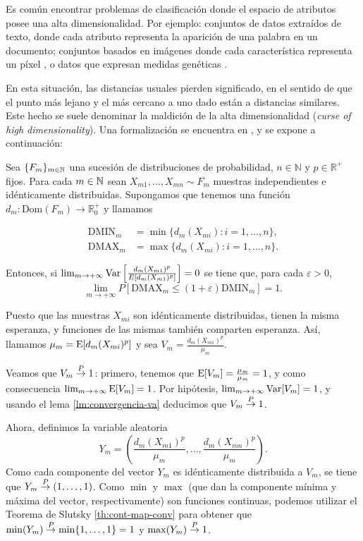 Es común encontrar problemas de clasificación donde el espacio de
atributos posee una alta dimensionalidad. Por ejemplo: conjuntos de
datos extraídos de texto, donde cada atributo representa la aparición de
una palabra en un documento; conjuntos basados en imágenes donde cada
característica representa un píxel \autocite{mnist}, o datos que
expresan medidas genéticas \autocite{clarke2008}.

En esta situación, las distancias usuales pierden significado, en el
sentido de que el punto más lejano y el más cercano a uno dado están a
distancias similares. Este hecho se suele denominar la maldición de la
alta dimensionalidad (\emph{curse of high dimensionality}). Una
formalización se encuentra en \textcite{beyer1999}, y se expone a
continuación:

\theob
Sea \(\{F_{m}\}_{m\in\mathbb{N}}\) una sucesión de distribuciones de
probabilidad, \(n\in \mathbb N\) y \(p\in\mathbb R^+\) fijos. Para cada
\(m\in\mathbb{N}\) sean \(X_{m1},\dots,X_{mn}\sim F_m\) muestras independientes
e idénticamente distribuidas. Supongamos que tenemos una función
\(d_m:\mathrm{Dom}(F_m)\rightarrow \mathbb R^+_0\) y llamamos

\begin{align*}
  \mathrm{DMIN}_{m}&=\min\{d_m(X_{mi}):i=1,\dots,n\},\\
  \mathrm{DMAX}_{m}&=\max\{d_m(X_{mi}):i=1,\dots,n\}.
\end{align*}

Entonces, si
\(\lim_{m\rightarrow +\infty}\mathrm{Var}\left[\frac{d_m(X_{m1})^p}{E[d_m(X_{m1})^p]}\right]=0\)
se tiene que, para cada \(\varepsilon > 0\),
\[\lim_{m\rightarrow +\infty}P\left[\mathrm{DMAX}_m\leq (1+\varepsilon) \mathrm{DMIN}_m\right]=1.\]
\proofb

Puesto que las muestras \(X_{mi}\) son idénticamente distribuidas,
tienen la misma esperanza, y funciones de las mismas también comparten
esperanza. Así, llamamos \(\mu_m = \mathrm{E}[d_m(X_{mi})^p]\) y sea
\(V_m =\frac{d_m(X_{m1})^p}{\mu_m}\).

Veamos que \(V_m\overset{P}{\rightarrow} 1\): primero, tenemos que
\(\mathrm{E}[V_m] = \frac{\mu_m}{\mu_m} = 1\), y como consecuencia
\(\lim_{m\rightarrow +\infty}\mathrm{E}[V_m] = 1\). Por hipótesis,
\(\lim_{m\rightarrow +\infty}\mathrm{Var}[V_m] = 1\), y usando el lema
\ref{lm:convergencia-va} deducimos que \(V_m\overset{P}{\rightarrow} 1\).

Ahora, definimos la variable aleatoria
\[Y_m=\left(\frac{d_m(X_{m1})^p}{\mu_m}, \dots, \frac{d_m(X_{mn})^p}{\mu_m}\right).\]
Como cada componente del vector \(Y_m\) es idénticamente distribuida a
\(V_m\), se tiene que \(Y_m\overset{P}{\rightarrow} (1, \dots, 1)\). Como \(\min\) y
\(\max\) (que dan la componente mínima y máxima del vector,
respectivamente) son funciones continuas, podemos utilizar el Teorema de
Slutsky \eqref{th:cont-map-conv} para obtener que
\(\min(Y_m)\overset{P}{\rightarrow} \min\{1, \dots, 1\} = 1\) y \(\max(Y_m)\overset{P}{\rightarrow} 1\).


